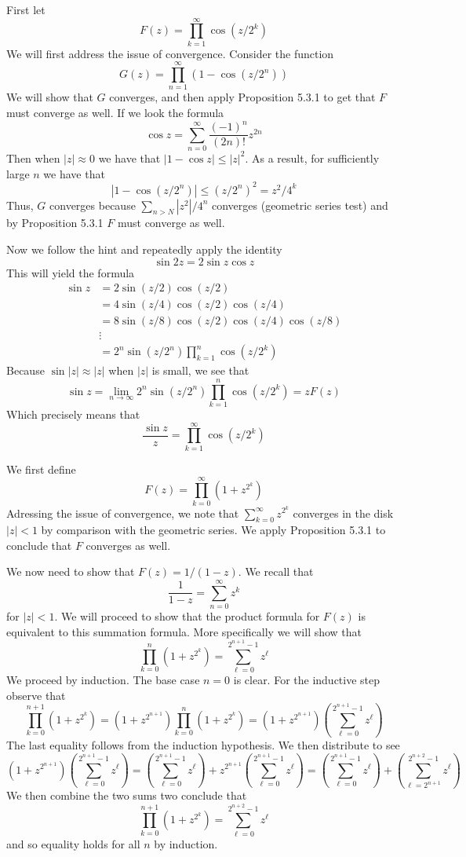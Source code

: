 \documentclass{article}
\newcommand{\exercise}[1]{\noindent{\textbf{Exercise #1:}}}
\begin{document}
\exercise{5.6.8}

First let
\[
F(z) = \prod_{k=1}^\infty \cos (z/2^k)
\]
We will first address the issue of convergence. Consider the function
\[
G(z) = \prod_{n=1}^\infty (1 - \cos (z/2^n))
\]
We will show that $G$ converges, and then apply Proposition 5.3.1 to
get that $F$ must converge as well. If we look the formula
\[
\cos z = \sum_{n=0}^\infty \frac{(-1)^n}{(2n)!}z^{2n}
\]
Then when $|z| \approx 0$ we have that $|1-\cos z| \leq |z|^2$. As a
result, for sufficiently large $n$ we have that
\[
|1-\cos(z/2^n)| \leq (z/2^n)^2 = z^2/4^k
\]
Thus, $G$ converges because $\sum_{n > N} |z^2|/4^n$ converges
(geometric series test) and by Proposition 5.3.1 $F$ must converge as
well.

Now we follow the hint and repeatedly apply the identity
\[
\sin 2z = 2\sin z\cos z
\]
This will yield the formula
\begin{align*}
  \sin z &= 2\sin(z/2)\cos(z/2) \\
  &= 4\sin(z/4)\cos(z/2)\cos(z/4) \\
  &= 8\sin(z/8)\cos(z/2)\cos(z/4)\cos(z/8) \\
  &\vdots \\
  &= 2^n\sin(z/2^n)\prod_{k=1}^n \cos(z/2^k)
\end{align*}
Because $\sin |z| \approx |z|$ when $|z|$ is small, we see that
\[
\sin z = \lim_{n\to\infty} 2^n\sin(z/2^n)\prod_{k=1}^n \cos(z/2^k) = zF(z)
\]
Which precisely means that
\[
\frac{\sin z}{z} = \prod_{k=1}^\infty \cos(z/2^k)
\]

\exercise{5.6.9}

We first define
\[
F(z) = \prod_{k=0}^\infty (1 + z^{2^k})
\]
Adressing the issue of convergence, we note that $\sum_{k=0}^\infty
z^{2^k}$ converges in the disk $|z| < 1$ by comparison with the
geometric series. We apply Proposition 5.3.1 to conclude that $F$
converges as well.

We now need to show that $F(z) = 1/(1-z)$. We recall that
\[
\frac{1}{1-z} = \sum_{n=0}^\infty z^k
\]
for $|z| < 1$. We will proceed to show that the product formula for
$F(z)$ is equivalent to this summation formula. More specifically we
will show that
\[
\prod_{k=0}^n (1+z^{2^k}) = \sum_{\ell=0}^{2^{n+1}-1} z^\ell
\]
We proceed by induction. The base case $n=0$ is clear. For the
inductive step observe that
\[
\prod_{k=0}^{n+1} (1+z^{2^k}) = (1+z^{2^{n+1}})\prod_{k=0}^n
(1+z^{2^k}) = (1+z^{2^{n+1}})\left(\sum_{\ell=0}^{2^{n+1}-1} z^\ell\right)
\]
The last equality follows from the induction hypothesis. We then
distribute to see
\[
(1+z^{2^{n+1}})\left(\sum_{\ell=0}^{2^{n+1}-1} z^\ell\right) =
\left(\sum_{\ell=0}^{2^{n+1}-1} z^\ell\right) +
z^{2^{n+1}}\left(\sum_{\ell=0}^{2^{n+1}-1} z^\ell\right) =
\left(\sum_{\ell=0}^{2^{n+1}-1} z^\ell\right) +
\left(\sum_{\ell=2^{n+1}}^{2^{n+2}-1} z^\ell\right)
\]
We then combine the two sums two conclude that
\[
\prod_{k=0}^{n+1} (1+z^{2^k}) = \sum_{\ell=0}^{2^{n+2}-1} z^\ell
\]
and so equality holds for all $n$ by induction.
\end{document}

